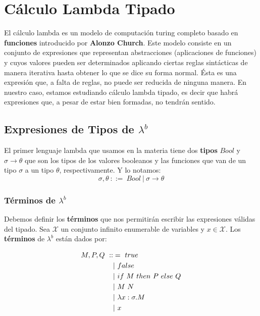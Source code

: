 \section{Cálculo Lambda Tipado}
El cálculo lambda es un modelo de computación turing completo basado en \textbf{funciones} introducido por \textbf{Alonzo Church}. Este modelo consiste en un conjunto de expresiones que representan abstracciones (aplicaciones de funciones) y cuyos valores pueden ser determinados aplicando ciertas reglas sintácticas de manera iterativa hasta obtener lo	que se dice su forma normal. Ésta es una expresión que, a falta de reglas, no puede ser reducida de ninguna manera. En nuestro caso, estamos estudiando cálculo lambda tipado, es decir que habrá expresiones que, a pesar de estar bien formadas, no tendrán sentido.


\subsection{Expresiones de Tipos de \texorpdfstring{$\lambda^b$}{lambda b}}
El primer lenguaje lambda que usamos en la materia tiene dos \textbf{tipos} $Bool$ y $\sigma\rightarrow\theta$ que son los tipos de los valores booleanos y las funciones que van de un tipo $\sigma$ a un tipo $\theta$, respectivamente. Y lo notamos:
\begin{equation*}
	\sigma,\theta ~::=~ Bool ~|~ \sigma\rightarrow\theta
\end{equation*}

\subsubsection{Términos de \texorpdfstring{$\lambda^b$}{lambda b}}
Debemos definir los \textbf{términos} que nos permitirán escribir las expresiones válidas del tipado. Sea $\mathcal{X}$ un conjunto infinito enumerable de variables y $x\in\mathcal{X}$. Los \textbf{términos} de $\lambda^b$ están dados por:

\begin{equation*}
	\begin{split}
		M, P, Q ~ ::&= ~ true \\
		& |~ false \\
		& |~ if~ M~ then~ P~ else~ Q \\
		& |~ M~N \\
		& |~ \lambda x: \sigma . M \\
		& |~ x
	\end{split}
\end{equation*}

